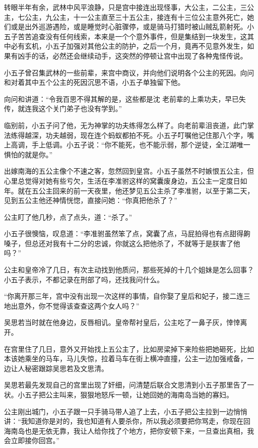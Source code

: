 转眼半年有余，武林中风平浪静，只是宫中接连出现怪事，大公主，二公主，三公主，七公主，九公主，十一公主直至三十五公主，接连有十三位公主意外死亡，她们或是出外巡游遇险，或是睡觉时心脏骤停，或是骑马打猎时被山贼乱箭射死。小五子苦苦追查没有任何线索，本来是一个个意外事件，但是集结到一块发生，这其中必有玄机，小五子加强对其他公主的防护，之后一个月，竟再不见意外发生，如果有凶手的话，必然还会继续动手，这突然的停顿让宫中出现了各种鬼怪传说。

小五子曾召集武林的一些前辈，来宫中商议，并向他们说明各个公主的死因。向问和对着其中五个公主的死因沉思不语，小五子单独留下他。

向问和讲道：“令我百思不得其解的是，这些都是沈
老前辈的上乘功夫，早已失传，就连我这个关门弟子也没有学到。”

临别前，小五子问了他，无为神掌的功夫练得怎么样了。向老前辈沮丧道，此门掌法练得越深，功夫越弱，现在连个蚂蚁都拍不死。小五子叮嘱他记住那八个字，嘴上高调，手上低调。小五子说：“你不能死，也不能示弱，那个逆徒，全江湖唯一惧怕的就是你。”
\newline

出嫁南海的五公主像个不速之客，忽然回到皇宫。小五子虽然不时嫉恨五公主，但心里总觉得对她有些亏欠，生活在李准驸这样的窝囊废身边，五公主一定度日如年。就在五公主回来的前一天夜里，他还梦见五公主杀了李准驸，以至于第二天，见到五公主他还神情恍惚，直接问她：“你真把他杀了？”

公主盯了他几秒，点了点头，道：“杀了。”

小五子很懊恼，叹息道：“李准驸虽然笨了点，窝囊了点，马屁拍得也有点甜得齁嗓子，但总还对我有十二分的忠诚，你就这么把他杀了，不就等于是朕害了他吗？”
\newline

公主和皇帝冷了几日，有次主动找到他质问，那些死掉的十几个姐妹是怎么回事？小五子表示，不都记录在刑部了吗，还找我问什么。

“你离开那三年，宫中没有出现一次这样的事情，自你娶了皇后和妃子，接二连三地出意外，你不觉得该查查这两个女人吗？”

吴思若当时就在他身边，反唇相讥。皇帝帮衬皇后，公主吃了一鼻子灰，悻悻离开。

在宫里住了几日，意外又开始找上五公主了，比如房梁掉下来险些把她砸死，比如本该她乘坐的马车，马儿失惊，拉着马车在街上横冲直撞，公主一边加强戒备，一边让人秘密跟踪吴思若及文思清。

吴思若最先发现自己的宫里出现了奸细，问清楚后联合文思清到小五子那里告了一状。小五子把公主叫来，狠狠地怒斥一顿，让她回她的海南岛当她的寡妇。

公主刚出城门，小五子跟一只手骑马带人追了上去，小五子把公主拉到一边悄悄讲：“我知道你是对的，我也知道有人要杀你，所以我必须要把你骂走，你现在回海南岛也是无依无靠，我让人给你找了个地方，把你安顿下来，一旦查出真相，我会立即接你回宫。”

